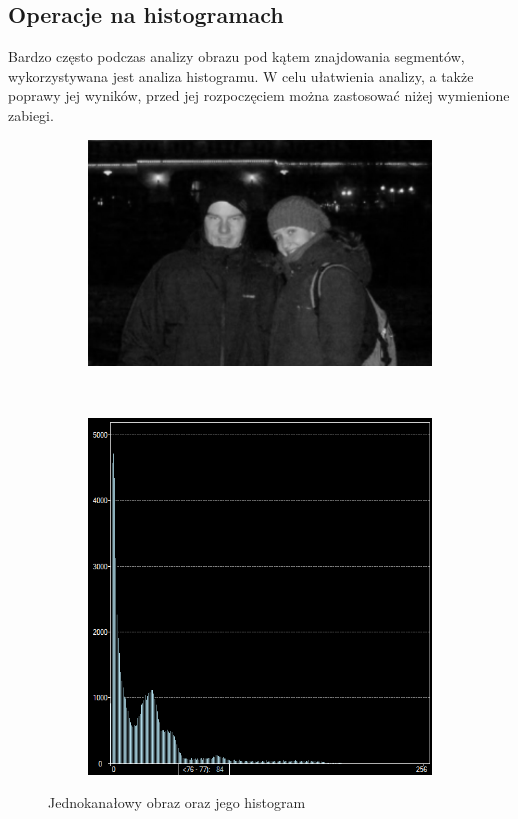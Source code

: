 \subsection{Operacje na histogramach}
Bardzo często podczas analizy obrazu pod kątem znajdowania segmentów, wykorzystywana jest analiza histogramu. W celu ułatwienia analizy, a także poprawy jej wyników, przed jej rozpoczęciem można zastosować niżej wymienione zabiegi.
\begin{figure}
  \centering
  \begin{subfigure}[b]{0.45\textwidth}
    \includegraphics[width=\textwidth]{img/image-histogram}
    \label{fig:image_histogram}
  \end{subfigure}
  ~
  \begin{subfigure}[b]{0.45\textwidth}
    \includegraphics[width=\textwidth]{img/image-histogram-histogram}
    \label{fig:image_histogram_histogram}
  \end{subfigure}
  \caption{Jednokanałowy obraz oraz jego histogram}
  \label{fig:image_histogram_g}
\end{figure}
